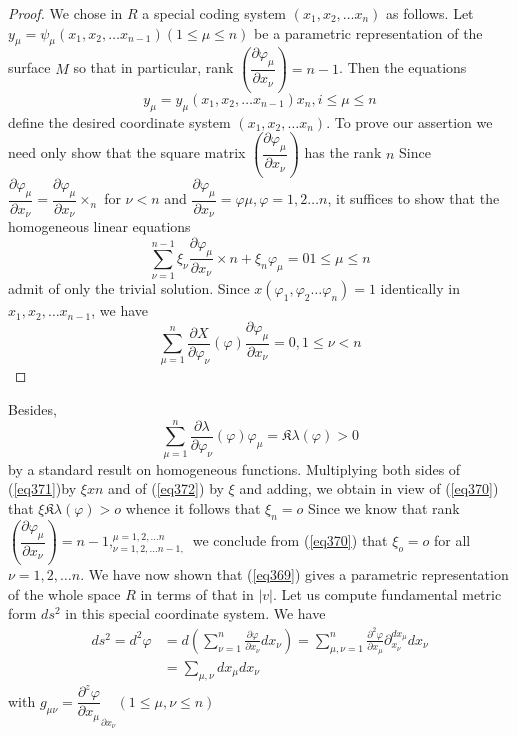 \begin{proof}
We chose in $R$ a special coding system $ (x_1, x_2 , \ldots x_n)$
as follows. Let $y_\mu = \psi_\mu (x_1, x_2 , \ldots x_{n-1})
(1 \le \mu \le n)$ be a parametric representation of the surface $M$
so that in particular, rank $(\dfrac{\partial \varphi_{\mu}}{\partial
  x_{\nu}}) = n-1$. Then the equations 
\begin{equation*}
y_\mu = y_\mu (x_1, x_2 , \ldots x_{n-1}) x_n , i \le \mu \le n
\tag{369}\label{eq369} 
\end{equation*}
define the desired coordinate system $(x_1, x_2 , \ldots x_n)$. To
prove our assertion we need only show that the square matrix
$(\dfrac{\partial \varphi_\mu}{\partial x_\nu})$ has the rank $n$
Since $\dfrac{\partial \varphi_\mu}{\partial x_\nu} = \dfrac{\partial
  \varphi_\mu}{\partial x_\nu} \times_n$ for $\nu < n$ and
$\dfrac{\partial \varphi_\mu}{\partial x_\nu} = \varphi \mu, \varphi =
1,2 \ldots n$, it suffices to show that the homogeneous linear
equations  
\begin{equation*}
\sum^{n-1}_{\nu = 1} \xi_\nu \frac{\partial \varphi_\mu}{\partial
  x_\nu} \times n + \xi_n \varphi_\mu = 0 1 \le \mu \le n
\tag{370}\label{eq370}  
\end{equation*}
admit of only the trivial solution. Since $x (\varphi_1 , \varphi_2
\ldots \varphi_n ) = 1$ identically in $x_1 , x_2, \ldots x_{n-1}$, we
have  
\begin{equation*}
\sum^n_{\mu = 1} \frac{\partial X}{\partial \varphi_\nu} (\varphi)
\frac{\partial \varphi_\mu}{\partial x_\nu}= 0, 1 \le \nu < n
\tag{371}\label{eq371}   
\end{equation*}
\end{proof}

Besides, 
\begin{equation*}
\sum^n_{\mu = 1} \frac{\partial \lambda}{\partial \varphi_\nu}
(\varphi)  \varphi_{\mu} = \mathfrak{K} \lambda (\varphi) > 0
\tag{372}\label{eq372}    
\end{equation*}
by a standard result on homogeneous functions. Multiplying both sides  
of (\ref{eq371})\pageoriginale by $\xi x n $ and of (\ref{eq372}) by
$\xi$ and adding, we obtain  
in view of (\ref{eq370}) that $\xi \mathfrak{K} \lambda (\varphi)> o$ whence
it follows that $\xi_n = o$ Since we know that rank $(\dfrac{\partial
  \varphi_\mu}{\partial x_\nu}) = n - 1, ^{\mu = 1, 2, \ldots n}_{\nu
  = 1, 2, \ldots n - 1,}$ we conclude from (\ref{eq370}) that $\xi _o = o $
for all $\nu = 1, 2, \ldots n$. We have now shown that (\ref{eq369}) gives a
parametric representation of the whole space $R$ in terms of that in
$| v |$. Let us compute fundamental metric form $ds^2$ in this
special coordinate system. We have 
\begin{align*}
ds^2  = d^2 \varphi & = d(\sum^{n}_{\nu = 1} \frac{\partial
  \varphi}{\partial x _\nu} d x _\nu ) = \sum^{n}_{\mu, \nu = 1}
\frac{\partial^2 \varphi}{\partial x_\mu} \partial ^{dx_\mu}_{x_\nu} d
x_\nu \\ 
& = \sum_{\mu, \nu} d x_\mu dx _\nu \tag{373}\label{eq373}   
\end{align*}
with \; $g_{\mu \nu} = \dfrac{\partial^z \varphi}{\partial
  x_\mu}_{\partial x_\nu} (1 \le \mu, \nu \le n) $ 

